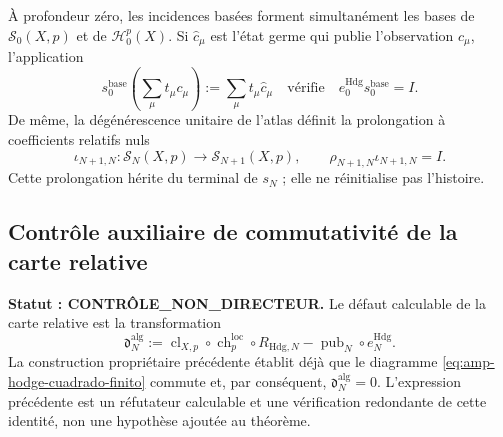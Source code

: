 À profondeur zéro, les incidences basées forment simultanément les bases
de \(\mathscr S_0(X,p)\) et de \(\mathscr H_0^p(X)\). Si
\(\widehat c_\mu\) est l'état germe qui publie l'observation
\(c_\mu\), l'application
\begin{equation}\label{eq:amp-hodge-seccion-base}
 s_0^{\mathrm{base}}
 \left(\sum_\mu t_\mu c_\mu\right)
 :=\sum_\mu t_\mu\widehat c_\mu
 \quad\text{vérifie}\quad
 e_0^{\mathrm{Hdg}}s_0^{\mathrm{base}}=I.
\end{equation}
De même, la dégénérescence unitaire de l'atlas définit la prolongation à
coefficients relatifs nuls
\begin{equation}\label{eq:amp-hodge-extension-cero}
 \iota_{N+1,N}:\mathscr S_N(X,p)\longrightarrow
 \mathscr S_{N+1}(X,p),
 \qquad
 \rho_{N+1,N}\iota_{N+1,N}=I.
\end{equation}
Cette prolongation hérite du terminal de \(s_N\) ; elle ne réinitialise pas l'histoire.

\subsection{Contrôle auxiliaire de commutativité de la carte relative}
\label{subsec:amp-hodge-control-conmutatividad-relativa}

\noindent\textbf{Statut : CONTRÔLE\_NON\_DIRECTEUR.}
Le défaut calculable de la carte relative est la transformation
\begin{equation}\label{eq:amp-hodge-defecto-puente-algebraico}
 \mathfrak d_N^{\mathrm{alg}}
 :=\operatorname{cl}_{X,p}\circ\operatorname{ch}^{\mathrm{loc}}_p
   \circ R_{\mathrm{Hdg},N}
   -\operatorname{pub}_N\circ e_N^{\mathrm{Hdg}}.
\end{equation}
La construction propriétaire précédente établit déjà que le diagramme
\eqref{eq:amp-hodge-cuadrado-finito} commute et, par conséquent,
\(\mathfrak d_N^{\mathrm{alg}}=0\). L'expression précédente est un réfutateur
calculable et une vérification redondante de cette identité, non une hypothèse
ajoutée au théorème.


